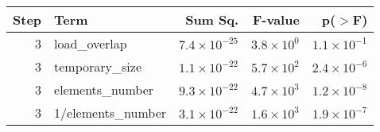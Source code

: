 \begin{table}[ht]
\centering
\begin{tabular}{rlrrr}
  \toprule
Step & Term & Sum Sq. & F-value & p($>$F) \\ 
  \midrule
3 & load\_overlap & $7.4 \times 10^{-25}$ & $3.8 \times 10^{0}$ & $1.1 \times 10^{-1}$ \\ 
  3 & temporary\_size & $1.1 \times 10^{-22}$ & $5.7 \times 10^{2}$ & $2.4 \times 10^{-6}$ \\ 
  3 & elements\_number & $9.3 \times 10^{-22}$ & $4.7 \times 10^{3}$ & $1.2 \times 10^{-8}$ \\ 
  3 & 1/elements\_number & $3.1 \times 10^{-22}$ & $1.6 \times 10^{3}$ & $1.9 \times 10^{-7}$ \\ 
   \bottomrule
\end{tabular}
\end{table}

